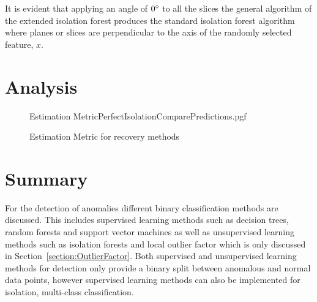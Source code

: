 It is evident that applying an angle of $0\degree$ to all the slices the general algorithm of the extended isolation forest produces the standard isolation forest algorithm where planes or slices are perpendicular to the axis of the randomly selected feature, $x$.

\section{Analysis}
\begin{figure}[!htb]
	\centering
	{Estimation MetricPerfectIsolationComparePredictions.pgf}
	
	\caption{Estimation Metric for recovery methods}
	\label{fig:RecoveryComparisonMagnetic}
\end{figure}

\section{Summary}
For the detection of anomalies different binary classification methods are discussed. This includes supervised learning methods such as decision trees, random forests and support vector machines as well as unsupervised learning methods such as isolation forests and local outlier factor which is only discussed in Section~\ref{section:OutlierFactor}. Both supervised and unsupervised learning methods for detection only provide a binary split between anomalous and normal data points, however supervised learning methods can also be implemented for isolation, multi-class classification.